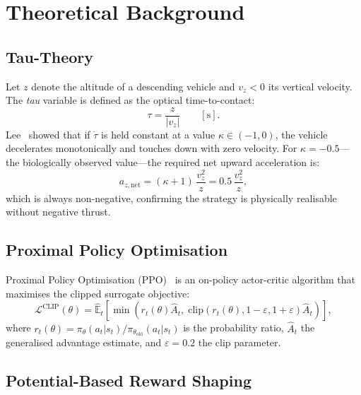 \documentclass[10pt,twocolumn]{article}
\begin{document}
\section{Theoretical Background}
\label{sec:theory}

\subsection{Tau-Theory}

Let $z$ denote the altitude of a descending vehicle and $v_z < 0$ its vertical
velocity.
The \emph{tau} variable is defined as the optical time-to-contact:
\begin{equation}
  \tau = \frac{z}{|v_z|}  \qquad [\text{s}].
  \label{eq:tau}
\end{equation}
Lee~\cite{lee1976} showed that if $\dot{\tau}$ is held constant at a value
$\kappa \in (-1,0)$, the vehicle decelerates monotonically and touches down with
zero velocity.
For $\kappa = -0.5$---the biologically observed value---the required net upward
acceleration is:
\begin{equation}
  a_{z,\text{net}} = (\kappa + 1)\,\frac{v_z^2}{z} = 0.5\,\frac{v_z^2}{z},
  \label{eq:tau_thrust}
\end{equation}
which is always non-negative, confirming the strategy is physically realisable
without negative thrust.

\subsection{Proximal Policy Optimisation}

Proximal Policy Optimisation (PPO)~\cite{schulman2017ppo} is an on-policy
actor-critic algorithm that maximises the clipped surrogate objective:
\begin{equation}
  \mathcal{L}^{\text{CLIP}}(\theta) =
  \hat{\mathbb{E}}_t\!\left[\min\!\left(r_t(\theta)\hat{A}_t,\;
  \mathrm{clip}(r_t(\theta), 1{-}\varepsilon, 1{+}\varepsilon)
  \hat{A}_t\right)\right],
\end{equation}
where $r_t(\theta) = \pi_\theta(a_t|s_t)/\pi_{\theta_{\text{old}}}(a_t|s_t)$
is the probability ratio, $\hat{A}_t$ the generalised advantage estimate, and
$\varepsilon = 0.2$ the clip parameter.

\subsection{Potential-Based Reward Shaping}
\end{document}
